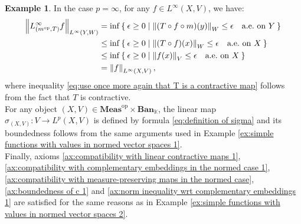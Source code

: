 \documentclass{amsart}
\theoremstyle{definition}
\newtheorem{example}[definition]{Example}
\theoremstyle{plain}
\newcommand{\norm}[1]{\left\lVert #1\right\rVert} %
\newcommand{\opMeas}{\mathbf{Meas}^\mathrm{op}}
\newcommand{\Ban}{\mathbf{Ban}_{\mathbb{K}}}
\begin{document}
\begin{example}
            In the case $p = \infty$, for any $f \in L^\infty(X,V)$, we have:
            \begin{align}
                \norm{L^\infty_{\left( m^{\mathrm{op}},T \right)} f}_{L^\infty(Y,W)} &= \inf \Set{\epsilon \geq 0 | \norm{(T \circ f \circ m)(y)}_W \leq \epsilon \quad \text{a.e.~on} ~ Y} \notag \\
                &\leq \inf \Set{\epsilon \geq 0 | \norm{(T \circ f)(x)}_W \leq \epsilon \quad \text{a.e.~on} ~ X} \notag \\
                &\leq \inf \Set{\epsilon \geq 0 | \norm{f(x)}_V \leq \epsilon \quad \text{a.e.~on} ~ X} \label{eq:use once more again that T is a contractive map} \\
                &= \norm{f}_{L^\infty(X,V)}, \notag
            \end{align}
            where inequality \eqref{eq:use once more again that T is a contractive map} follows from the fact that $T$ is contractive. \\
            For any object $(X,V) \in \opMeas \times \Ban$, the linear map $\sigma_{(X,V)} \colon V \rightarrow L^p(X,V)$ is defined by formula \eqref{eq:definition of sigma} and its boundedness follows from the same arguments used in Example \ref{ex:simple functions with values in normed vector spaces 1}. \\
            Finally, axioms \eqref{ax:compatibility with linear contractive maps 1}, \eqref{ax:compatibility with complementary embeddings in the normed case 1}, \ref{ax:compatibility with measure-preserving maps in the normed case}, \eqref{ax:boundedness of c 1} and \eqref{ax:norm inequality wrt complementary embeddings 1} are satisfied for the same reasons as in Example \ref{ex:simple functions with values in normed vector spaces 2}.
        \end{example}
        
\end{document}
